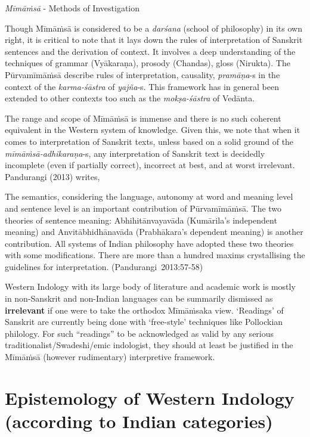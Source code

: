 \newpage

{\sl Mīmāṁsā} - Methods of Investigation



Though Mīmāṁsā is considered to be a {\sl darśana} (school of philosophy) in its own right, it is critical to note that it lays down the rules of interpretation of Sanskrit sentences and the derivation of context. It involves a deep understanding of the techniques of grammar (Vyākaraṇa), prosody (Chandas), gloss (Nirukta). The Pūrvamīmāṁsā describe rules of interpretation, causality, {\sl pramāṇa}-s in the context of the {\sl karma-śāstra} of {\sl yajña}-s. This framework has in general been extended to other contexts too such as the {\sl mokṣa-śāstra} of Vedānta.

The range and scope of Mīmāṁsā is immense and there is no such coherent equivalent in the Western system of knowledge. Given this, we note that when it comes to interpretation of Sanskrit texts, unless based on a solid ground of the {\sl mīmāṁsā-adhikaraṇa}-s, any interpretation of Sanskrit text is decidedly incomplete (even if partially correct), incorrect at best, and at worst irrelevant. Pandurangi (2013) writes,
\begin{myquote}
The semantics, considering the language, autonomy at word and meaning level and sentence level is an important contribution of Pūrva\-mīmāṁ\-sā. The two theories of sentence meaning: Abhihitānvayavāda (Kumārila's independent meaning) and Anvitābhidhānavāda (Prabhākara's dependent meaning) is another contribution. All systems of Indian philosophy have adopted these two theories with some modifications. There are more than a hundred maxims crystallising the guidelines for interpretation. \hfill \hbox{(Pandurangi 2013:57-58)}
\end{myquote}

Western Indology with its large body of literature and academic work is mostly in non-Sanskrit and non-Indian languages can be summarily dismissed as {\bf irrelevant} if one were to take the orthodox Mīmāṁsaka view. `Readings' of Sanskrit are currently being done with `free-style' techniques like Pollockian philology. For such ``readings'' to be acknowledged as valid by any serious traditionalist/Swadeshi/emic indologist, they should at least be justified in the Mīmāṁsā (however rudimentary) interpretive framework. 

\section*{Epistemology of Western Indology (according to Indian categories)}


